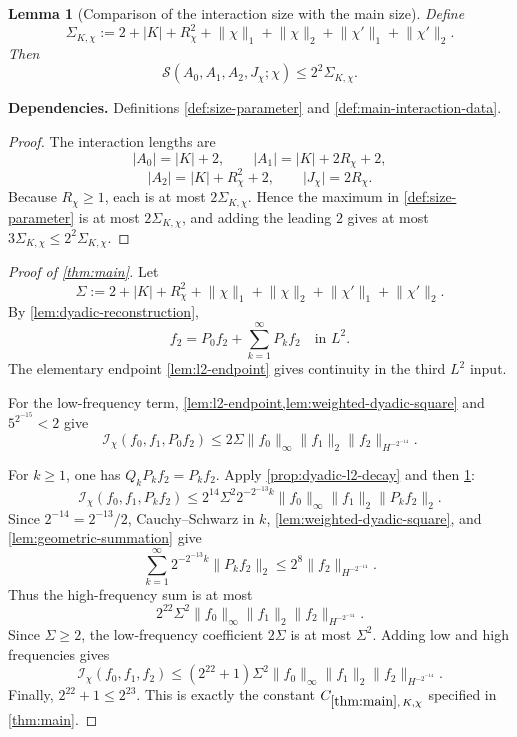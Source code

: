 \documentclass[11pt]{article}
\newtheorem{lemma}[lemma]{Lemma}
\theoremstyle{definition}
\theoremstyle{remark}
\newcommand{\1}{\mathbf 1}
\newcommand{\Ichi}{\mathcal I_{\chi}}
\newcommand{\hNorm}[2]{\lVert #1\rVert_{H^{#2}}}
\newcommand{\lpNorm}[2]{\lVert #1\rVert_{#2}}
\newcommand{\uses}[1]{\par\smallskip\noindent\textbf{Dependencies.} #1\par\smallskip}
\newcommand{\Ssize}[2]{\mathcal S\!\left(#1;#2\right)}
\begin{document}
\begin{lemma}[Comparison of the interaction size with the main size]\label{lem:interaction-size-comparison}
Define
\[
\Sigma_{K,\chi}
:=
2+\lvert K\rvert+R_\chi^2
+\lpNorm\chi1+\lpNorm\chi2
+\lpNorm{\chi'}1+\lpNorm{\chi'}2.
\]
Then
\[
\Ssize{A_0,A_1,A_2,J_\chi}{\chi}
\leq2^2\Sigma_{K,\chi}.
\]
\end{lemma}

\uses{Definitions \ref{def:size-parameter} and \ref{def:main-interaction-data}.}

\begin{proof}
The interaction lengths are
\[
\lvert A_0\rvert=\lvert K\rvert+2,
\qquad
\lvert A_1\rvert=\lvert K\rvert+2R_\chi+2,
\]
\[
\lvert A_2\rvert=\lvert K\rvert+R_\chi^2+2,
\qquad
\lvert J_\chi\rvert=2R_\chi.
\]
Because $R_\chi\geq1$, each is at most $2\Sigma_{K,\chi}$.  Hence the maximum in \cref{def:size-parameter} is at most $2\Sigma_{K,\chi}$, and adding the leading $2$ gives at most $3\Sigma_{K,\chi}\leq2^2\Sigma_{K,\chi}$.
\end{proof}

\begin{proof}[Proof of \cref{thm:main}]
Let
\[
\Sigma:=
2+\lvert K\rvert+R_\chi^2
+\lpNorm\chi1+\lpNorm\chi2
+\lpNorm{\chi'}1+\lpNorm{\chi'}2.
\]
By \cref{lem:dyadic-reconstruction},
\[
f_2=P_0f_2+\sum_{k=1}^\infty P_kf_2
\quad\text{in }L^2.
\]
The elementary endpoint \cref{lem:l2-endpoint} gives continuity in the third $L^2$ input.

For the low-frequency term, \cref{lem:l2-endpoint,lem:weighted-dyadic-square} and
$5^{2^{-15}}<2$ give
\[
\Ichi(f_0,f_1,P_0f_2)
\leq
2\Sigma\lpNorm{f_0}\infty\lpNorm{f_1}2
\hNorm{f_2}{-2^{-14}}.
\]

For $k\geq1$, one has $Q_kP_kf_2=P_kf_2$.  Apply \cref{prop:dyadic-l2-decay} and then \cref{lem:interaction-size-comparison}:
\[
\Ichi(f_0,f_1,P_kf_2)
\leq
2^{14}\Sigma^2
2^{-2^{-13}k}
\lpNorm{f_0}\infty\lpNorm{f_1}2\lpNorm{P_kf_2}2.
\]
Since $2^{-14}=2^{-13}/2$, Cauchy--Schwarz in $k$, \cref{lem:weighted-dyadic-square}, and \cref{lem:geometric-summation} give
\[
\sum_{k=1}^\infty
2^{-2^{-13}k}\lpNorm{P_kf_2}2
\leq
2^8\hNorm{f_2}{-2^{-14}}.
\]
Thus the high-frequency sum is at most
\[
2^{22}\Sigma^2
\lpNorm{f_0}\infty\lpNorm{f_1}2
\hNorm{f_2}{-2^{-14}}.
\]
Since $\Sigma\geq2$, the low-frequency coefficient $2\Sigma$ is at most $\Sigma^2$.  Adding low and high frequencies gives
\[
\Ichi(f_0,f_1,f_2)
\leq
(2^{22}+1)\Sigma^2
\lpNorm{f_0}\infty\lpNorm{f_1}2
\hNorm{f_2}{-2^{-14}}.
\]
Finally, $2^{22}+1\leq2^{23}$.  This is exactly the constant
$C_{\ref{thm:main},\,K,\chi}$ specified in \cref{thm:main}.
\end{proof}
\end{document}
